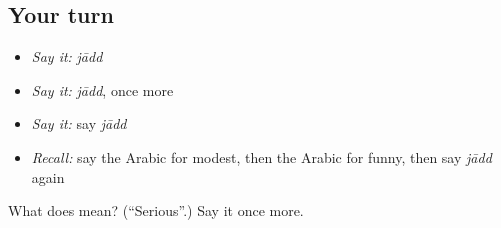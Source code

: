 \subsection*{Your turn}
\begin{itemize}
\raggedright
  \item \emph{Say it:} \emph{jādd}
  \item \emph{Say it:} \emph{jādd}, once more
  \item \emph{Say it:} say \emph{jādd}
  \item \emph{Recall:} say the Arabic for modest, then the Arabic for funny, then say \emph{jādd} again
\end{itemize}

\begin{tcolorbox}[breakable,colback=teal!4,colframe=teal!35!black,title={Before you move on}]
What does  mean? (\textquotedblleft{}Serious\textquotedblright{}.) Say it once more.
\end{tcolorbox}

